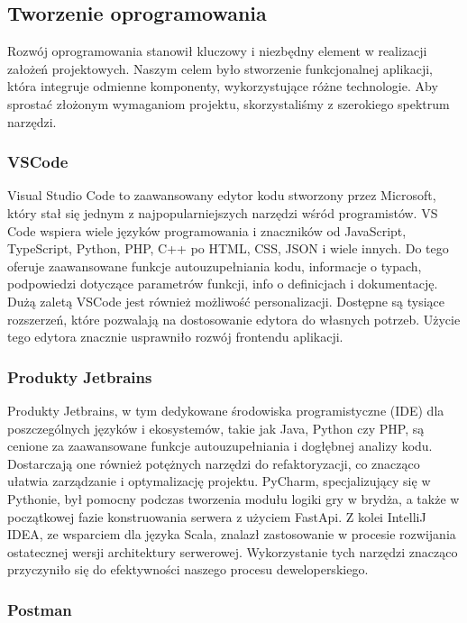 \subsection{Tworzenie oprogramowania}

Rozwój oprogramowania stanowił kluczowy i niezbędny element w realizacji założeń projektowych. 
Naszym celem było stworzenie funkcjonalnej aplikacji, która integruje odmienne komponenty, wykorzystujące różne technologie. 
Aby sprostać złożonym wymaganiom projektu, skorzystaliśmy z szerokiego spektrum narzędzi.

\subsubsection{VSCode}

Visual Studio Code to zaawansowany edytor kodu stworzony przez Microsoft, który stał się jednym z najpopularniejszych narzędzi wśród programistów.
VS Code wspiera wiele języków programowania i znaczników od JavaScript, TypeScript, Python, PHP, C++ po HTML, CSS, JSON i wiele innych.
Do tego oferuje zaawansowane funkcje autouzupełniania kodu, informacje o typach, podpowiedzi dotyczące parametrów funkcji, info o definicjach i dokumentację.
Dużą zaletą VSCode jest również możliwość personalizacji. Dostępne są tysiące rozszerzeń, które pozwalają na dostosowanie edytora do własnych potrzeb.
Użycie tego edytora znacznie usprawniło rozwój frontendu aplikacji.

\subsubsection{Produkty Jetbrains}

Produkty Jetbrains, w tym dedykowane środowiska programistyczne (IDE) dla poszczególnych języków i ekosystemów, takie jak Java, Python czy PHP, są cenione za zaawansowane funkcje autouzupełniania i dogłębnej analizy kodu. Dostarczają one również potężnych narzędzi do refaktoryzacji, co znacząco ułatwia zarządzanie i optymalizację projektu. PyCharm, specjalizujący się w Pythonie, był pomocny podczas tworzenia modułu logiki gry w brydża, a także w początkowej fazie konstruowania serwera z użyciem FastApi. Z kolei IntelliJ IDEA, ze wsparciem dla języka Scala, znalazł zastosowanie w procesie rozwijania ostatecznej wersji architektury serwerowej. Wykorzystanie tych narzędzi znacząco przyczyniło się do efektywności naszego procesu deweloperskiego.

\subsubsection{Postman}


